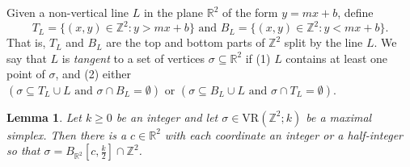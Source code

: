 \documentclass[12pt,a4paper]{amsart}
\newtheorem{lemma}[theorem]{Lemma}
\theoremstyle{definition}
\newcommand{\R}{\ensuremath{\mathbb{R}}}
\newcommand{\Z}{\ensuremath{\mathbb{Z}}}
\newcommand{\vr}[2]{\mathrm{VR}(#1;#2)}
\numberwithin{equation}{section}
\begin{document}
Given a non-vertical line $L$ in the plane $\R^2$ of the form $y=mx+b$, define 
\[T_L = \{ (x,y) \in \Z^2 : y> mx+b \} \text{ and } 
B_L = \{ (x,y) \in \Z^2 : y< mx+b \}.\]
That is, $T_L$ and $B_L$ are the top and bottom parts of $\Z^2$ split by the line $L$.
We say that $L$ is \emph{tangent} to a set of vertices $\sigma \subseteq \R^2$ if (1) $L$ contains at least one point of $\sigma$, and (2) either
$(\sigma \subseteq T_L \cup L \text{ and } \sigma \cap B_L =\emptyset) \text{ or } (\sigma \subseteq B_L \cup L \text{ and } \sigma \cap T_L =\emptyset).$


\begin{lemma}
\label{Lemma:EnclosedSigma}
Let $k\ge 0$ be an integer and let $\sigma \in \vr{\Z^2}{k}$ be a maximal simplex.
Then there is a $c \in \R^2$ with each coordinate an integer or a half-integer so that $\sigma = B_{\R^2}[c,\frac{k}{2}] \cap \Z^2$.
\end{lemma}
\end{document}
